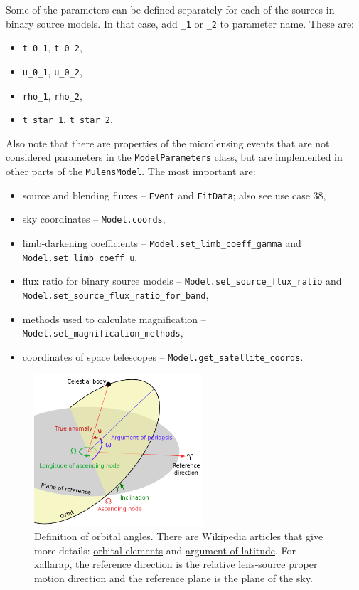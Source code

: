 \documentclass[12pt]{article}
\begin{document}
Some of the parameters can be defined separately for each of the sources in binary source models.  
In that case, add {\tt \_1} or {\tt \_2} to parameter name. These are:
\begin{itemize}
\item {\tt t\_0\_1}, {\tt t\_0\_2},
\item {\tt u\_0\_1}, {\tt u\_0\_2},
\item {\tt rho\_1}, {\tt rho\_2},
\item {\tt t\_star\_1}, {\tt t\_star\_2}.
\end{itemize}

Also note that there are properties of the microlensing events that are not considered parameters in the \texttt{ModelParameters} class, but are implemented in other parts of the \texttt{MulensModel}. The most important are:
\begin{itemize}
 \item source and blending fluxes -- \texttt{Event} and \texttt{FitData}; also see use case 38,
 \item sky coordinates -- \texttt{Model.coords},
 \item limb-darkening coefficients -- \texttt{Model.set\_limb\_coeff\_gamma} and \texttt{Model.set\_limb\_coeff\_u},
 \item flux ratio for binary source models -- \texttt{Model.set\_source\_flux\_ratio} and\\ \texttt{Model.set\_source\_flux\_ratio\_for\_band},
 \item methods used to calculate magnification -- \texttt{Model.set\_magnification\_methods},
 \item coordinates of space telescopes -- \texttt{Model.get\_satellite\_coords}.
\end{itemize}

\begin{figure}
\centering
\includegraphics[width=0.56\textwidth]{images/orbit_parameters/Orbit1_svg}
\caption{
Definition of orbital angles. 
There are Wikipedia articles that give more details: 
\href{https://en.wikipedia.org/wiki/Orbital_elements}{orbital elements} and 
\href{https://en.wikipedia.org/wiki/Argument_of_latitude}{argument of latitude}.
For xallarap, the reference direction is the relative lens-source proper motion direction and the reference plane is the plane of the sky. 
}
\end{figure}
\end{document}
